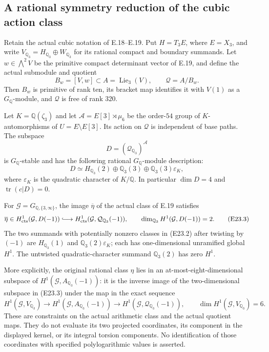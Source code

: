 \subsection{A rational symmetry reduction of the cubic action class}

\begin{proposition}
\label{E-cubic-symmetry}
Retain the actual cubic notation of E.18--E.19. Put
$H=T_3E$, where $E=X_3$, and write
$V_{\mathbb Q_3}=H_{\mathbb Q_3}\oplus W_{\mathbb Q_3}$
for its rational compact and boundary summands. Let
$w\in\bigwedge^2V$ be the primitive compact determinant
vector of E.19, and define the actual submodule and quotient
\[
 B_w=[V,w]\subset A=\operatorname{Lie}_3(V),
 \qquad \mathcal Q=A/B_w.
 \tag{E23.1}
\]
Then $B_w$ is primitive of rank ten, its bracket map identifies
it with $V(1)$ as a $G_{\mathbb Q}$-module, and
$\mathcal Q$ is free of rank $320$.

Let $K=\mathbb Q(\zeta_3)$ and let
$\mathcal A=E[3]\rtimes\mu_6$ be the order-$54$ group of
$K$-automorphisms of $U=E\setminus E[3]$. Its action on
$\mathcal Q$ is independent of base paths. The subspace
\[
 D=(\mathcal Q_{\mathbb Q_3})^{\mathcal A}
\]
is $G_{\mathbb Q}$-stable and has the following rational
$G_{\mathbb Q}$-module description:
\[
 D\simeq H_{\mathbb Q_3}(2)\oplus
        \mathbb Q_3(3)\oplus
        \mathbb Q_3(3)\varepsilon_K,
 \tag{E23.2}
\]
where $\varepsilon_K$ is the quadratic character of $K/\mathbb Q$.
In particular $\dim D=4$ and $\operatorname{tr}(c|D)=0$.

For $\mathcal G=G_{\mathbb Q,\{3,\infty\}}$, the image
$\overline\eta$ of the actual class of E.19 satisfies
\[
 \overline\eta\in
 H^1_{\rm cts}(\mathcal G,D(-1))
 \lhook\joinrel\longrightarrow
 H^1_{\rm cts}(\mathcal G,\mathcal Q_{\mathbb Q_3}(-1)),
 \qquad
 \dim_{\mathbb Q_3}H^1(\mathcal G,D(-1))=2.
 \tag{E23.3}
\]
The two summands with potentially nonzero classes in (E23.2)
after twisting by $(-1)$ are $H_{\mathbb Q_3}(1)$ and
$\mathbb Q_3(2)\varepsilon_K$; each has one-dimensional
unramified global $H^1$. The untwisted quadratic-character
summand $\mathbb Q_3(2)$ has zero $H^1$.

More explicitly, the original rational class $\eta$ lies in
an at-most-eight-dimensional subspace of
$H^1(\mathcal G,A_{\mathbb Q_3}(-1))$: it is the inverse
image of the two-dimensional subspace in (E23.3) under the
map in the exact sequence
\[
 H^1(\mathcal G,V_{\mathbb Q_3})\longrightarrow
 H^1(\mathcal G,A_{\mathbb Q_3}(-1))\longrightarrow
 H^1(\mathcal G,\mathcal Q_{\mathbb Q_3}(-1)),
 \qquad \dim H^1(\mathcal G,V_{\mathbb Q_3})=6.
 \tag{E23.4}
\]
These are constraints on the actual arithmetic class and the
actual quotient maps. They do not evaluate its two projected
coordinates, its component in the displayed kernel, or its
integral torsion components. No identification of those
coordinates with specified polylogarithmic values is asserted.
\end{proposition}
